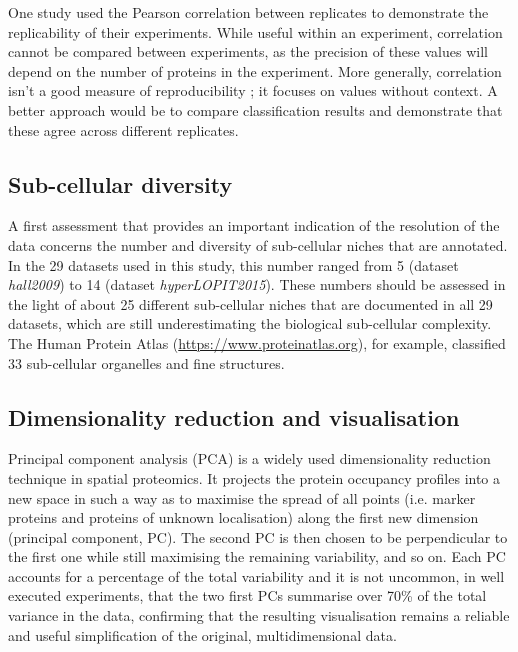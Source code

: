 \documentclass[12pt]{article}\usepackage[]{graphicx}\usepackage[]{color}
\begin{document}
One study \citep{Itzhak:2016} used the Pearson correlation between
replicates to demonstrate the replicability of their
experiments. While useful within an experiment, correlation cannot be
compared between experiments, as the precision of these values will
depend on the number of proteins in the experiment. More generally,
correlation isn't a good measure of reproducibility
\cite{Irizarry:2015}; it focuses on values without context. A better
approach would be to compare classification results and demonstrate
that these agree across different replicates.


\subsection{Sub-cellular diversity}\label{sec:sub-cell-divers}

A first assessment that provides an important indication of the
resolution of the data concerns the number and diversity of
sub-cellular niches that are annotated. In the 29
datasets used in this study, this number ranged from
5 (dataset
\textit{hall2009}) to
14 (dataset
\textit{hyperLOPIT2015}). These numbers
should be assessed in the light of about 25 different sub-cellular
niches that are documented in all 29 datasets, which
are still underestimating the biological sub-cellular complexity.  The
Human Protein Atlas \citep{Thul:2017}
(\url{https://www.proteinatlas.org}), for example, classified 33
sub-cellular organelles and fine structures.

\subsection{Dimensionality reduction and visualisation}\label{sec:vis}

Principal component analysis (PCA) is a widely used dimensionality
reduction technique in spatial proteomics. It projects the protein
occupancy profiles into a new space in such a way as to maximise the
spread of all points (i.e. marker proteins and proteins of unknown
localisation) along the first new dimension (principal component,
PC). The second PC is then chosen to be perpendicular to the first one
while still maximising the remaining variability, and so on. Each PC
accounts for a percentage of the total variability and it is not
uncommon, in well executed experiments, that the two first PCs
summarise over 70\% of the total variance in the data, confirming that
the resulting visualisation remains a reliable and useful
simplification of the original, multidimensional data.
\end{document}
